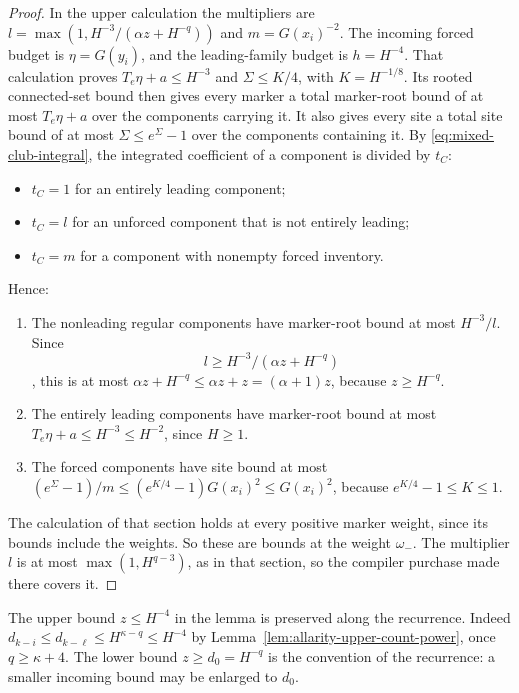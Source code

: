 \begin{proof}
In the upper calculation the multipliers are
$l=\max(1,H^{-3}/(\alpha z+H^{-q}))$ and $m=G(x_i)^{-2}$. The incoming
forced budget is $\eta=G(y_i)$, and the leading-family budget is
$h=H^{-4}$. That calculation proves $T_e\eta+a\le H^{-3}$ and
$\Sigma\le K/4$, with $K=H^{-1/8}$. Its rooted connected-set bound then
gives every marker a total marker-root bound of at most $T_e\eta+a$ over
the components carrying it. It also gives every site a total site bound
of at most $\Sigma\le e^{\Sigma}-1$ over the components containing it.
By \eqref{eq:mixed-club-integral}, the integrated coefficient of a
component is divided by $t_C$:
\begin{itemize}
\item $t_C=1$ for an entirely leading component;
\item $t_C=l$ for an unforced component that is not entirely leading;
\item $t_C=m$ for a component with nonempty forced inventory.
\end{itemize}
Hence:
\begin{enumerate}
\item The nonleading regular components have marker-root bound at most
 $H^{-3}/l$. Since \[
 l\ge H^{-3}/(\alpha z+H^{-q})
\], this is at most
 $\alpha z+H^{-q}\le\alpha z+z=(\alpha+1)z$, because $z\ge H^{-q}$.
\item The entirely leading components have marker-root bound at most
 $T_e\eta+a\le H^{-3}\le H^{-2}$, since $H\ge1$.
\item The forced components have site bound at most
 $(e^\Sigma-1)/m\le(e^{K/4}-1)G(x_i)^2\le G(x_i)^2$, because
 $e^{K/4}-1\le K\le1$.
\end{enumerate}
The calculation of that section holds at every positive marker weight,
since its bounds include the weights. So these are bounds at the weight
$\omega_-$. The multiplier $l$ is at most $\max(1,H^{q-3})$, as in that
section, so the compiler purchase made there covers it.
\end{proof}

The upper bound $z\le H^{-4}$ in the lemma is preserved along the
recurrence. Indeed $d_{k-i}\le d_{k-\ell}\le H^{\kappa-q}\le H^{-4}$ by
Lemma~\ref{lem:allarity-upper-count-power}, once $q\ge\kappa+4$. The
lower bound $z\ge d_0=H^{-q}$ is the convention of the recurrence: a
smaller incoming bound may be enlarged to $d_0$.

